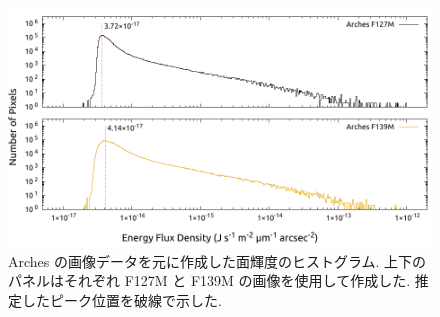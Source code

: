 \documentclass[10pt,a4paper,dvipdfmx,uplatex]{jsarticle}
\begin{document}
\begin{figure}
  \centering
  \includegraphics[width=\linewidth,page=1]{img/histogram.pdf}
  \caption{Arches の画像データを元に作成した面輝度のヒストグラム. 上下のパネルはそれぞれ F127M と F139M の画像を使用して作成した. 推定したピーク位置を破線で示した.}
  \label{fig:histogram:arches}
\end{figure}
\end{document}

